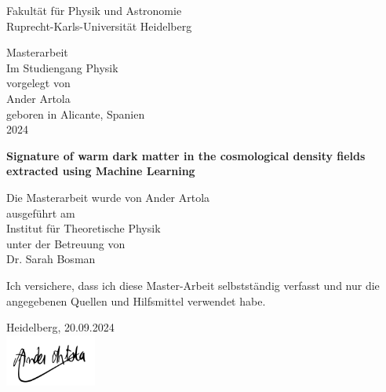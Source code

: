 \documentclass[
     12pt,                    %
     a4paper,             %
     BCOR=10mm,     %
     DIV=14,                 %
     listof=totoc,                    %
     bibliography=totoc,       %
     index=totoc,              %
     twoside,
     headsepline
     ]{scrreprt}
\begin{document}


\thispagestyle{empty}
\begin{center}
  \renewcommand{\baselinestretch}{2.00}
  \Large\sffamily
  Fakult\"{a}t f\"{u}r Physik und Astronomie\\
  \large
  Ruprecht-Karls-Universit\"{a}t Heidelberg
  \par\vfill\normalfont
  Masterarbeit\\
  Im Studiengang Physik\\
  vorgelegt von\\
  Ander Artola\\
  geboren in Alicante, Spanien \\
  2024\\
\end{center}
\newpage

\thispagestyle{empty}
\begin{center}
  \renewcommand{\baselinestretch}{2.00}
  \Large\bfseries\sffamily
  Signature of warm dark matter in the
  cosmological density fields extracted using
  Machine Learning
  \par
  \vfill
  \large\normalfont
  Die Masterarbeit wurde von Ander Artola\\
  ausgef\"{u}hrt am\\
  Institut f\"{u}r Theoretische Physik\\
  unter der Betreuung von\\
  Dr. Sarah Bosman
\end{center}\par
\vspace{5\baselineskip}

\renewcommand{\baselinestretch}{1.00}\normalsize

\onehalfspacing

\thispagestyle{empty}

\vspace*{100pt}
\noindent
Ich versichere, dass ich diese Master-Arbeit selbstständig verfasst und nur die angegebenen
Quellen und Hilfsmittel verwendet habe.

\vspace*{50pt}

\noindent
Heidelberg, 20.09.2024\\
\includegraphics[width=3cm]{img/ML/signature.png} %
\end{document}
